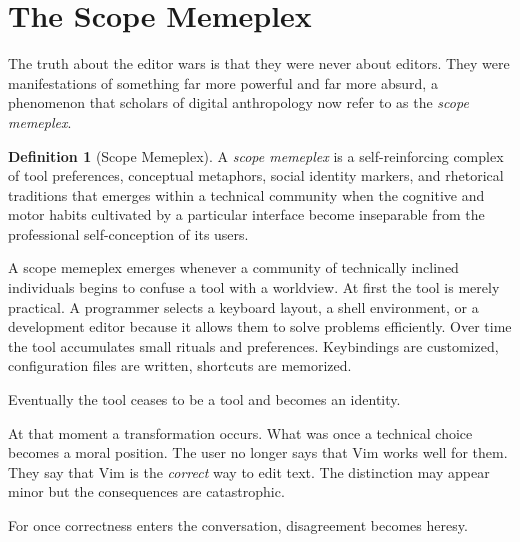 \documentclass[12pt]{article}
\theoremstyle{definition}
\newtheorem{definition}{Definition}[section]
\begin{document}
\section{The Scope Memeplex}

The truth about the editor wars is that they were never about editors.
They were manifestations of something far more powerful and far more
absurd, a phenomenon that scholars of digital anthropology now refer to
as the \emph{scope memeplex}.

\begin{definition}[Scope Memeplex]
A \emph{scope memeplex} is a self-reinforcing complex of tool preferences,
conceptual metaphors, social identity markers, and rhetorical traditions
that emerges within a technical community when the cognitive and motor
habits cultivated by a particular interface become inseparable from the
professional self-conception of its users.
\end{definition}

A scope memeplex emerges whenever a community of technically inclined
individuals begins to confuse a tool with a worldview. At first the tool
is merely practical. A programmer selects a keyboard layout, a shell
environment, or a development editor because it allows them to solve
problems efficiently. Over time the tool accumulates small rituals and
preferences. Keybindings are customized, configuration files are written,
shortcuts are memorized.

Eventually the tool ceases to be a tool and becomes an identity.

At that moment a transformation occurs. What was once a technical choice
becomes a moral position. The user no longer says that Vim works well
for them. They say that Vim is the \emph{correct} way to edit text. The
distinction may appear minor but the consequences are catastrophic.

For once correctness enters the conversation, disagreement becomes heresy.
\end{document}
